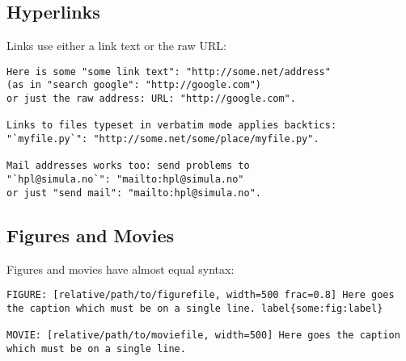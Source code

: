 \documentclass[%
oneside,                 %
final,                   %
10pt]{article}
\begin{document}
\subsection{Hyperlinks}
Links use either a link text or the raw URL:
\begin{Verbatim}[numbers=none,fontsize=\fontsize{9pt}{9pt},baselinestretch=0.95,xleftmargin=2mm]
Here is some "some link text": "http://some.net/address"
(as in "search google": "http://google.com")
or just the raw address: URL: "http://google.com".

Links to files typeset in verbatim mode applies backtics:
"`myfile.py`": "http://some.net/some/place/myfile.py".

Mail addresses works too: send problems to
"`hpl@simula.no`": "mailto:hpl@simula.no"
or just "send mail": "mailto:hpl@simula.no".

\end{Verbatim}

\subsection{Figures and Movies}
Figures and movies have almost equal syntax:
\begin{Verbatim}[numbers=none,fontsize=\fontsize{9pt}{9pt},baselinestretch=0.95,xleftmargin=2mm]
FIGURE: [relative/path/to/figurefile, width=500 frac=0.8] Here goes the caption which must be on a single line. label{some:fig:label}

MOVIE: [relative/path/to/moviefile, width=500] Here goes the caption which must be on a single line. 


\end{Verbatim}
\end{document}

